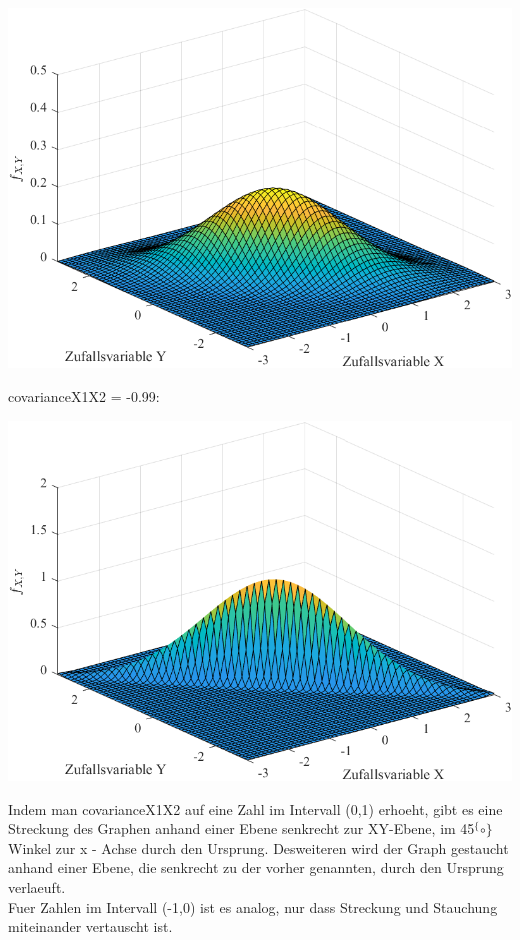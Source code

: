 \documentclass[a4paper]{scrartcl}
\begin{document}
\begin{center}
	\includegraphics*[scale = 0.5]{question3b3.png}
\end{center}
covarianceX1X2 = -0.99:
\begin{center}
	\includegraphics*[scale = 0.5]{question3b4.png}
\end{center}
Indem man covarianceX1X2 auf eine Zahl im Intervall (0,1) erhoeht, gibt es eine Streckung des Graphen anhand einer Ebene senkrecht zur XY-Ebene, im 45$^\{\circ\}$ Winkel zur x - Achse durch den Ursprung. Desweiteren wird der Graph gestaucht anhand einer Ebene, die senkrecht zu der vorher genannten, durch den Ursprung verlaeuft.\\
Fuer Zahlen im Intervall (-1,0) ist es analog, nur dass Streckung und Stauchung miteinander vertauscht ist.\\
\end{document}

